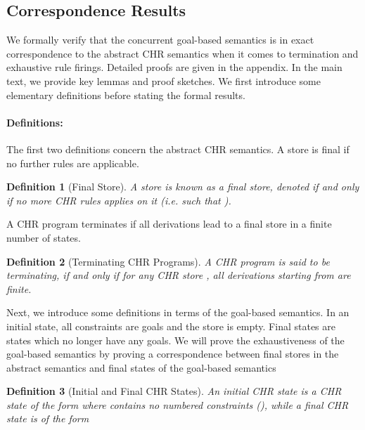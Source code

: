 \documentclass{tlp}
\newtheorem{definition}{Definition}[section]
\begin{document}
\subsection{Correspondence Results} \label{ssec:corr}

We formally verify that the concurrent goal-based semantics is in exact correspondence
to the abstract CHR semantics when it comes to termination and exhaustive rule firings.
Detailed proofs are given in the appendix. In the main text, we provide key lemmas 
and proof sketches.
We first introduce some elementary definitions before stating the formal results.

\paragraph{\bf Definitions:}

The first two definitions concern the abstract CHR semantics.
A store is final if no further rules are applicable.

\begin{definition} [Final Store] \label{def:final-store}
    A store  is known as a final store, denoted 
   if and only if no more CHR rules applies on it (i.e.  such that
   ).
\end{definition}

A CHR program terminates if all derivations lead to a final store in 
a finite number of states.


\begin{definition} [Terminating CHR Programs] \label{def:terminate}
  A CHR program  is said to be terminating, if and only if for any CHR store ,
  all derivations starting from  are finite.
\end{definition}

Next, we introduce some definitions in terms of the goal-based semantics. In an initial state, all 
constraints are goals and the store is empty. Final states are states which no longer have any 
goals. We will prove the exhaustiveness of the goal-based semantics by proving a correspondence
between final stores in the abstract semantics and final states of the goal-based semantics

\begin{definition} [Initial and Final CHR States] \label{def:init-fin-state}
   An initial CHR state is a CHR state of the form  where  
   contains no numbered constraints (), while a final CHR state is of the form 
   
\end{definition}
\end{document}
